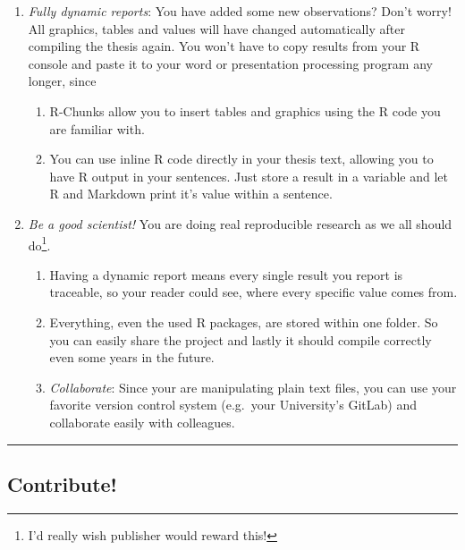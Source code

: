 \documentclass[]{book}
\providecommand{\tightlist}{%
  \setlength{\itemsep}{0pt}\setlength{\parskip}{0pt}}
\let\rmarkdownfootnote\footnote%
\def\footnote{\protect\rmarkdownfootnote}
\theoremstyle{definition}
\theoremstyle{definition}
\theoremstyle{remark}
\begin{document}
\begin{enumerate}
\def\labelenumi{\arabic{enumi}.}
\tightlist
\item
  \emph{Fully dynamic reports}: You have added some new observations?
  Don't worry! All graphics, tables and values will have changed
  automatically after compiling the thesis again. You won't have to copy
  results from your R console and paste it to your word or presentation
  processing program any longer, since

  \begin{enumerate}
  \def\labelenumii{\alph{enumii}.}
  \tightlist
  \item
    R-Chunks allow you to insert tables and graphics using the R code
    you are familiar with.
  \item
    You can use inline R code directly in your thesis text, allowing you
    to have R output in your sentences. Just store a result in a
    variable and let R and Markdown print it's value within a sentence.
  \end{enumerate}
\item
  \emph{Be a good scientist!} You are doing real reproducible research
  as we all should do\footnote{I'd really wish publisher would reward
    this!}.

  \begin{enumerate}
  \def\labelenumii{\alph{enumii}.}
  \tightlist
  \item
    Having a dynamic report means every single result you report is
    traceable, so your reader could see, where every specific value
    comes from.
  \item
    Everything, even the used R packages, are stored within one folder.
    So you can easily share the project and lastly it should compile
    correctly even some years in the future.
  \item
    \emph{Collaborate}: Since your are manipulating plain text files,
    you can use your favorite version control system (e.g.~your
    University's GitLab) and collaborate easily with colleagues.
  \end{enumerate}
\end{enumerate}

\begin{center}\rule{0.5\linewidth}{\linethickness}\end{center}

\subsection*{Contribute!}\label{contribute}
\end{document}
